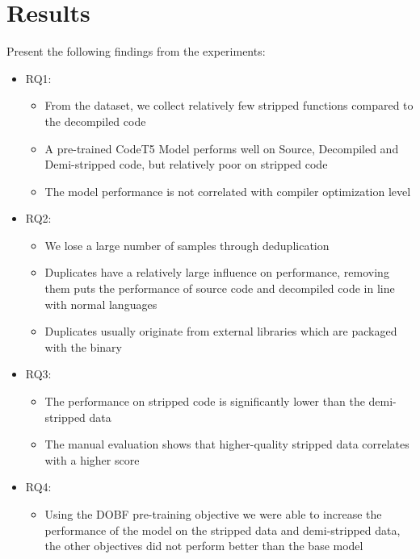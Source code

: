 \chapter{Results}
\label{results}
Present the following findings from the experiments:

\begin{itemize}
    \item RQ1:
    \begin{itemize}
        \item From the dataset, we collect relatively few stripped functions compared to the decompiled code
        \item A pre-trained CodeT5 Model performs well on Source, Decompiled and Demi-stripped code, but relatively poor on stripped code
        \item The model performance is not correlated with compiler optimization level
    \end{itemize}

    \item RQ2:
        \begin{itemize}
        \item We lose a large number of samples through deduplication
        \item Duplicates have a relatively large influence on performance, removing them puts the performance of source code and decompiled code in line with normal languages
        \item Duplicates usually originate from external libraries which are packaged with the binary 
    \end{itemize}
    \item RQ3:
    \begin{itemize}
        \item The performance on stripped code is significantly lower than the demi-stripped data
        \item The manual evaluation shows that higher-quality stripped data correlates with a higher score
    \end{itemize}

    \item RQ4:
        \begin{itemize}
        \item Using the DOBF pre-training objective we were able to increase the performance of the model on the stripped data and demi-stripped data, the other objectives did not perform better than the base model
        \end{itemize}
\end{itemize}
